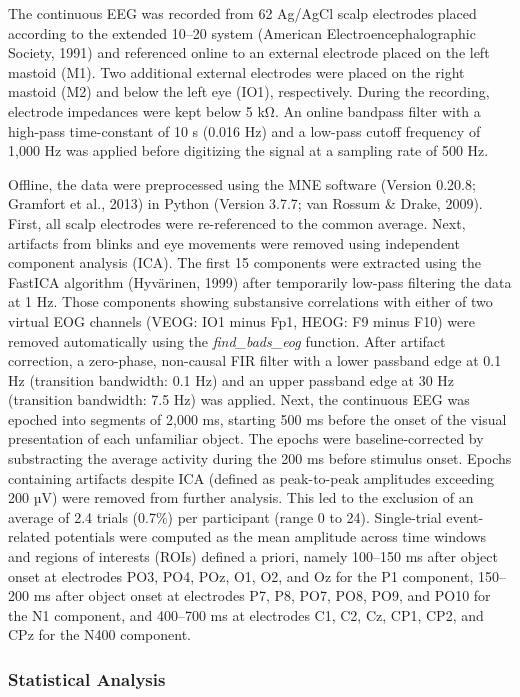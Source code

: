 \documentclass[
  english,
  man,11pt,floatsintext]{apa7}
\begin{document}
The continuous EEG was recorded from 62 Ag/AgCl scalp electrodes placed according to the extended 10--20 system (American Electroencephalographic Society, 1991) and referenced online to an external electrode placed on the left mastoid (M1). Two additional external electrodes were placed on the right mastoid (M2) and below the left eye (IO1), respectively. During the recording, electrode impedances were kept below 5 kΩ. An online bandpass filter with a high-pass time-constant of 10 s (0.016 Hz) and a low-pass cutoff frequency of 1,000 Hz was applied before digitizing the signal at a sampling rate of 500 Hz.

Offline, the data were preprocessed using the MNE software (Version 0.20.8; Gramfort et al., 2013) in Python (Version 3.7.7; van Rossum \& Drake, 2009). First, all scalp electrodes were re-referenced to the common average. Next, artifacts from blinks and eye movements were removed using independent component analysis (ICA). The first 15 components were extracted using the FastICA algorithm (Hyvärinen, 1999) after temporarily low-pass filtering the data at 1 Hz. Those components showing substansive correlations with either of two virtual EOG channels (VEOG: IO1 minus Fp1, HEOG: F9 minus F10) were removed automatically using the \emph{find\_bads\_eog} function. After artifact correction, a zero-phase, non-causal FIR filter with a lower passband edge at 0.1 Hz (transition bandwidth: 0.1 Hz) and an upper passband edge at 30 Hz (transition bandwidth: 7.5 Hz) was applied. Next, the continuous EEG was epoched into segments of 2,000 ms, starting 500 ms before the onset of the visual presentation of each unfamiliar object. The epochs were baseline-corrected by substracting the average activity during the 200 ms before stimulus onset. Epochs containing artifacts despite ICA (defined as peak-to-peak amplitudes exceeding 200 µV) were removed from further analysis. This led to the exclusion of an average of 2.4 trials (0.7\%) per participant (range 0 to 24). Single-trial event-related potentials were computed as the mean amplitude across time windows and regions of interests (ROIs) defined a priori, namely 100--150 ms after object onset at electrodes PO3, PO4, POz, O1, O2, and Oz for the P1 component, 150--200 ms after object onset at electrodes P7, P8, PO7, PO8, PO9, and PO10 for the N1 component, and 400--700 ms at electrodes C1, C2, Cz, CP1, CP2, and CPz for the N400 component.

\hypertarget{statistical-analysis}{%
\subsubsection{Statistical Analysis}\label{statistical-analysis}}
\end{document}
